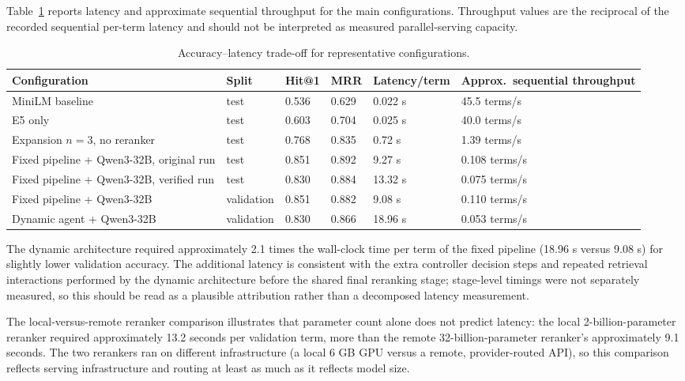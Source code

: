 Table~\ref{tab:latency} reports latency and approximate sequential throughput for the main configurations. Throughput values are the reciprocal of the recorded sequential per-term latency and should not be interpreted as measured parallel-serving capacity.

\begingroup
\footnotesize
\begin{table}[htbp]
\centering
\setlength{\tabcolsep}{4pt}
\begin{tabular}{p{4.0cm}p{1.3cm}p{0.9cm}p{0.9cm}p{1.4cm}p{2.6cm}}
\toprule
\textbf{Configuration} & \textbf{Split} & \textbf{Hit@1} & \textbf{MRR} & \textbf{Latency/term} & \textbf{Approx.\ sequential throughput}\\
\midrule
MiniLM baseline & test & 0.536 & 0.629 & 0.022 s & 45.5 terms/s\\
E5 only & test & 0.603 & 0.704 & 0.025 s & 40.0 terms/s\\
Expansion $n=3$, no reranker & test & 0.768 & 0.835 & 0.72 s & 1.39 terms/s\\
Fixed pipeline + Qwen3-32B, original run & test & 0.851 & 0.892 & 9.27 s & 0.108 terms/s\\
Fixed pipeline + Qwen3-32B, verified run & test & 0.830 & 0.884 & 13.32 s & 0.075 terms/s\\
Fixed pipeline + Qwen3-32B & validation & 0.851 & 0.882 & 9.08 s & 0.110 terms/s\\
Dynamic agent + Qwen3-32B & validation & 0.830 & 0.866 & 18.96 s & 0.053 terms/s\\
\bottomrule
\end{tabular}
\caption{Accuracy--latency trade-off for representative configurations.}
\label{tab:latency}
\end{table}
\endgroup

The dynamic architecture required approximately 2.1 times the wall-clock time per term of the fixed pipeline (18.96 s versus 9.08 s) for slightly lower validation accuracy. The additional latency is consistent with the extra controller decision steps and repeated retrieval interactions performed by the dynamic architecture before the shared final reranking stage; stage-level timings were not separately measured, so this should be read as a plausible attribution rather than a decomposed latency measurement.

The local-versus-remote reranker comparison illustrates that parameter count alone does not predict latency: the local 2-billion-parameter reranker required approximately 13.2 seconds per validation term, more than the remote 32-billion-parameter reranker's approximately 9.1 seconds. The two rerankers ran on different infrastructure (a local 6 GB GPU versus a remote, provider-routed API), so this comparison reflects serving infrastructure and routing at least as much as it reflects model size.


